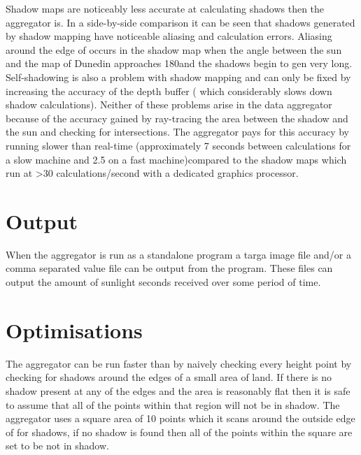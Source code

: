 \documentclass[12pt]{report}
\begin{document}
Shadow maps are noticeably less accurate at calculating shadows then the aggregator is. In a side-by-side comparison it can be seen that shadows generated by shadow mapping have noticeable aliasing and calculation errors. Aliasing around the edge of occurs in the shadow map when the angle between the sun and the map of Dunedin approaches 180\degree and the shadows begin to gen very long. Self-shadowing is also a problem with shadow mapping and can only be fixed by increasing the accuracy of the depth buffer (
which considerably slows down shadow calculations). Neither of these problems arise in the data aggregator because of the accuracy gained by ray-tracing the area between the shadow and the sun and checking for intersections. The aggregator pays for this accuracy by running slower than real-time (approximately 7 seconds between calculations for a slow machine and 2.5 on a fast machine)compared to the shadow maps which run at >30 calculations/second with a dedicated graphics processor.\\

\section{Output}%
When the aggregator is run as a standalone program a targa image file and/or a comma separated value file can be output from the program. These files can output the amount of sunlight seconds received over some period of time.\\

\section{Optimisations}
The aggregator can be run faster than by naively checking every height point by checking for shadows around the edges of a small area of land. If there is no shadow present at any of the edges and the area is reasonably flat then it is safe to assume that all of the points within that region will not be in shadow. The aggregator uses a square area of 10 points which it scans around the outside edge of for shadows, if no shadow is found then all of the points within the square are set to be not in shadow.\\
\end{document}

